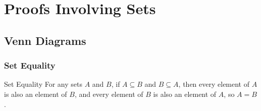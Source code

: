 \documentclass[../notes.tex]{subfiles}
\begin{document}
	\ifSubfilesClassLoaded{\setcounter{chapter}{3}}{}
	\chapter{Proofs Involving Sets}
		\section{Venn Diagrams}
			\subsection{Set Equality}
				\begin{definition}{Set Equality}
					For any sets $A$ and $B$, if $A \subseteq B$ and $B \subseteq A$, then every element of $A$ is also an element of $B$, and every element of $B$ is also an element of $A$, so $A = B$.
				\end{definition}
\end{document}
